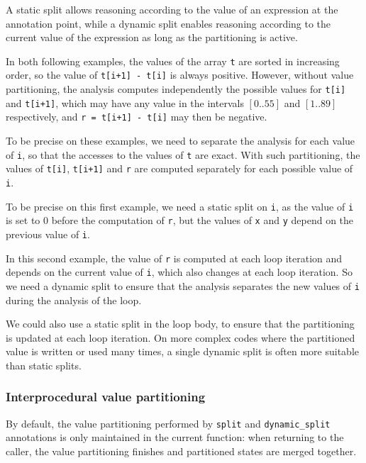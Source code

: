 \documentclass{frama-c-book}
\begin{document}
A static split allows reasoning according to the value of an expression at the
annotation point, while a dynamic split enables reasoning according to the
current value of the expression as long as the partitioning is active.

In both following examples, the values of the array \lstinline|t| are sorted in
increasing order, so the value of \lstinline|t[i+1] - t[i]| is always positive.
However, without value partitioning, the analysis computes independently the
possible values for \lstinline|t[i]| and \lstinline|t[i+1]|, which may have
any value in the intervals $[0..55]$ and $[1..89]$ respectively,
and \lstinline|r = t[i+1] - t[i]| may then be negative.

To be precise on these examples, we need to separate the analysis for each value
of \lstinline|i|, so that the accesses to the values of \lstinline|t| are exact.
With such partitioning, the values of \lstinline|t[i]|, \lstinline|t[i+1]| and
\lstinline|r| are computed separately for each possible value of \lstinline|i|.


To be precise on this first example, we need a static split on \lstinline|i|, as
the value of \lstinline|i| is set to 0 before the computation of \lstinline|r|,
but the values of \lstinline|x| and \lstinline|y| depend on the previous value
of \lstinline|i|.


In this second example, the value of \lstinline|r| is computed at each
loop iteration and depends on the current value of \lstinline|i|, which
also changes at each loop iteration.
So we need a dynamic split to ensure that the analysis separates the new
values of \lstinline|i| during the analysis of the loop.

We could also use a static split in the loop body, to ensure that the
partitioning is updated at each loop iteration. On more complex codes where
the partitioned value is written or used many times, a single dynamic split
is often more suitable than static splits.



\subsubsection{Interprocedural value partitioning}

By default, the value partitioning performed by \lstinline|split|
and \lstinline|dynamic_split| annotations is only maintained in the current
function: when returning to the caller, the value partitioning
finishes and partitioned states are merged together.
\end{document}
